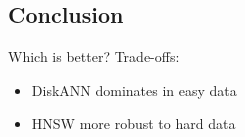 \subsection{Conclusion}

\begin{frame}{Which is better?}
    Trade-offs:
    \begin{itemize}
        \item DiskANN dominates in easy data
        \item HNSW more robust to hard data
    \end{itemize}
\end{frame}
